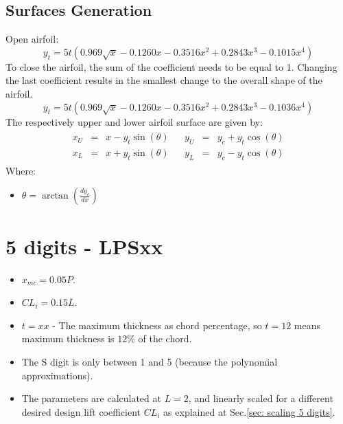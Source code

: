 \documentclass[11pt, a4paper]{article}
\begin{document}
\subsection{Surfaces Generation}
Open airfoil:
\begin{equation}
    y_t=5t\left(0.969\sqrt{x}-0.1260x-0.3516x^2+0.2843x^3-0.1015x^4\right)
\end{equation}
To close the airfoil, the sum of the coefficient needs to be equal to 1. Changing the last coefficient results in the smallest change to the overall shape of the airfoil.
\begin{equation}
    y_t=5t\left(0.969\sqrt{x}-0.1260x-0.3516x^2+0.2843x^3-0.1036x^4\right)
\end{equation}
The respectively upper and lower airfoil surface are given by:
\begin{equation}
    \begin{matrix}
        \begin{array}{rcl}
            x_U & = & x-y_t\sin\left(\theta\right) \\
            x_L & = & x+y_t\sin\left(\theta\right)
        \end{array} & \begin{array}{rcl}
            y_U & = & y_c+y_t\cos\left(\theta\right) \\
            y_L & = & y_c-y_t\cos\left(\theta\right)
        \end{array}
    \end{matrix}
\end{equation}
Where:
\begin{itemize}
    \item $\displaystyle \theta=\arctan\left(\frac{dy_c}{dx}\right)$
\end{itemize}

\newpage
\section{5 digits - LPSxx}
\begin{itemize}
    \item $\displaystyle x_{mc}=0.05P$.
    \item $\displaystyle CL_i=0.15L$.
    \item $t=xx$ - The maximum thickness as chord percentage, so $t=12$ means maximum thickness is $12\%$ of the chord.
    \item The S digit is only between 1 and 5 (because the polynomial approximations).
    \item The parameters are calculated at $L=2$, and linearly scaled for a different desired design lift coefficient $CL_i$ as explained at Sec.\ref{sec: scaling 5 digits}.
\end{itemize}
\end{document}
